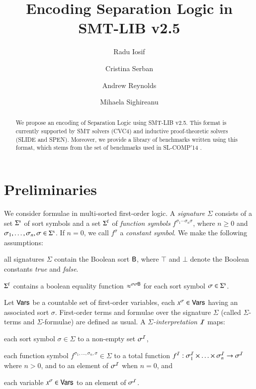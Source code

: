 \documentclass{llncs}
\begin{document}

\title{Encoding Separation Logic in SMT-LIB v2.5}

\author{Radu Iosif \and Cristina Serban \and Andrew Reynolds \and Mihaela Sighireanu} 


\maketitle

\begin{abstract}
  We propose an encoding of Separation Logic using SMT-LIB v2.5. This
  format is currently supported by SMT solvers (CVC4) and inductive
  proof-theoretic solvers (SLIDE and SPEN). Moreover, we provide a
  library of benchmarks written using this format, which stems from
  the set of benchmarks used in SL-COMP'14 \cite{sl-comp14}.
\end{abstract}

\section{Preliminaries}

We consider formulae in multi-sorted first-order logic.  A
\emph{signature} $\Sigma$ consists of a set $\Sigma^\mathrm{s}$ of sort
symbols and a set $\Sigma^\mathrm{f}$ of \emph{function symbols}
$f^{\sigma_1 \cdots \sigma_n \sigma}$, where $n \geq 0$ and $\sigma_1,
\ldots, \sigma_n, \sigma \in \Sigma^\mathrm{s}$. If $n=0$, we call
$f^\sigma$ a \emph{constant symbol}. We make the following
assumptions:
\begin{compactenum}
\item all signatures $\Sigma$ contain the Boolean sort $\mathsf{B}$, where
  $\top$ and $\bot$ denote the Boolean constants \emph{true} and
  \emph{false}. 
\item $\Sigma^\mathrm{f}$ contains a boolean equality function
  $\approx^{\sigma\sigma\mathsf{B}}$ for each sort symbol
  $\sigma\in\Sigma^\mathrm{s}$.
\end{compactenum}

Let $\mathsf{Vars}$ be a countable set of first-order variables, each
$x^\sigma \in \mathsf{Vars}$ having an associated sort $\sigma$. First-order
terms and formulae over the signature $\Sigma$ (called $\Sigma$-terms
and $\Sigma$-formulae) are defined as usual. A
\emph{$\Sigma$-interpretation $\mathcal{I}$} maps:\begin{compactitem}
\item each sort symbol $\sigma \in \Sigma$ to a non-empty set $\sigma^{\mathcal{I}}$,
\item each function symbol $f^{\sigma_1,\ldots,\sigma_n,\sigma} \in \Sigma$ to a
  total function $f^{\mathcal{I}} : \sigma^{\mathcal{I}}_1 \times \ldots \times \sigma^{\mathcal{I}}_n
  \rightarrow \sigma^{\mathcal{I}}$ where $n > 0$, and to an element of $\sigma^{\mathcal{I}}$ when $n
  = 0$, and
\item each variable $x^\sigma \in \mathsf{Vars}$ to an element of $\sigma^{\mathcal{I}}$.
\end{compactitem}
\end{document}
